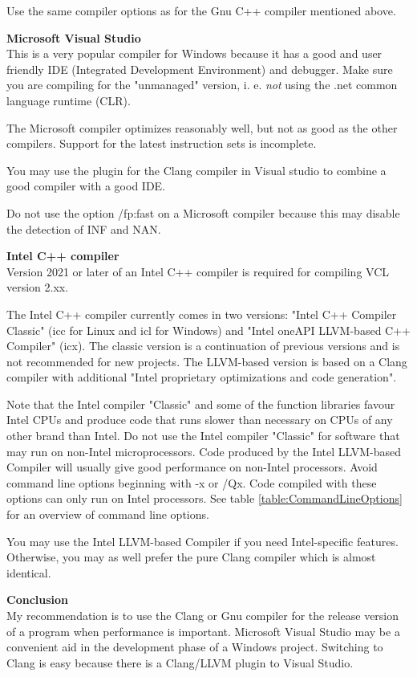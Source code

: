 \documentclass[vcl_manual.tex]{subfiles}
\begin{document}
Use the same compiler options as for the Gnu C++ compiler mentioned above.


\textbf{Microsoft Visual Studio}\\
This is a very popular compiler for Windows because it has a good and user friendly IDE (Integrated Development Environment) and debugger. Make sure you are compiling for the "unmanaged" version, i. e. \emph{not} using the .net common language runtime (CLR).

The Microsoft compiler optimizes reasonably well, but not as good as the other compilers. Support for the latest instruction sets is incomplete.

You may use the plugin for the Clang compiler in Visual studio to combine a good compiler with a good IDE.

Do not use the option /fp:fast on a Microsoft compiler because
this may disable the detection of INF and NAN.


\textbf{Intel C++ compiler}\\
Version 2021 or later of an Intel C++ compiler is required for compiling VCL version 2.xx.

The Intel C++ compiler currently comes in two versions: "Intel C++ Compiler Classic" (icc for Linux and icl for Windows) and "Intel oneAPI LLVM-based C++ Compiler" (icx). The classic version is a continuation of previous versions and is not recommended for new projects. The LLVM-based version is based on a Clang compiler with additional "Intel proprietary optimizations and code generation".

Note that the Intel compiler "Classic" and some of the function libraries favour Intel CPUs and produce code that runs slower than necessary on CPUs of any other brand than Intel. Do not use the Intel compiler "Classic" for software that may run on non-Intel microprocessors. Code produced by the Intel LLVM-based Compiler will usually give good performance on non-Intel processors. Avoid command line options beginning with -x or /Qx. Code compiled with these options can only run on Intel processors. See table \ref{table:CommandLineOptions} for an overview of command line options.

You may use the Intel LLVM-based Compiler if you need Intel-specific features. Otherwise, you may as well prefer the pure Clang compiler which is almost identical.


\textbf{Conclusion}\\
My recommendation is to use the Clang or Gnu compiler for the release version of a program when performance is important. Microsoft Visual Studio may be a convenient aid in the development phase of a Windows project. Switching to Clang is easy because there is a Clang/LLVM plugin to Visual Studio. 
\end{document}
